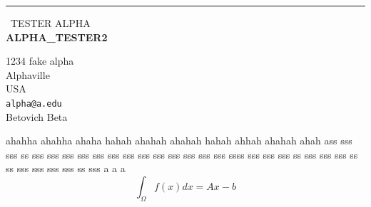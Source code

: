 \documentclass{report}
\begin{document}
\begin{center}
\rule{6in}{1pt} \
{\large TESTER ALPHA \\
{\bf ALPHA_TESTER2}}

1234 fake alpha \\ Alphaville \\ USA
\\
{\tt alpha@a.edu}\\
Betovich Beta \end{center}

ahahha ahahha ahaha hahah ahahah ahahah hahah ahhah ahahah ahah ass sss
sss ss sss sss sss sss sss sss sss sss sss sss sss sss sss ssss sss sss
sss ss sss sss sss ss ss sss sss sss sss ss sss a a a \[ \int_{\Omega}
f(x) dx = Ax - b \]
\end{document}
